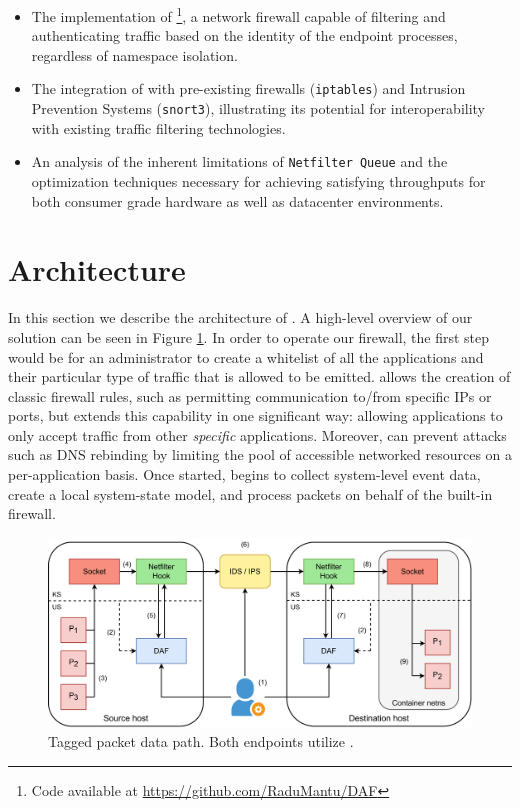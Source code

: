 \begin{itemize}
    \item The implementation of \daf{} \footnote{Code available at \url{https://github.com/RaduMantu/DAF}}, a network firewall capable of filtering and authenticating traffic based on the identity of the endpoint processes, regardless of namespace isolation.

    \item The integration of \daf{} with pre-existing firewalls (\texttt{iptables}) and Intrusion Prevention Systems (\texttt{snort3}), illustrating its potential for interoperability with existing traffic filtering technologies.

    \item An analysis of the inherent limitations of \texttt{Netfilter Queue} and the optimization techniques necessary for achieving satisfying throughputs for both consumer grade hardware as well as datacenter environments.
\end{itemize}

\section{Architecture}

In this section we describe the architecture of \daf{}. A high-level overview of our solution can be seen in Figure \ref{appfw:daf:fig:sys-architecture}. In order to operate our firewall, the first step would be for an administrator to create a whitelist of all the applications and their particular type of traffic that is allowed to be emitted. \daf{} allows the creation of classic firewall rules, such as permitting communication to/from specific IPs or ports, but extends this capability in one significant way: allowing applications to only accept traffic from other \textit{specific} applications. Moreover, \daf{} can prevent attacks such as DNS rebinding by limiting the pool of accessible networked resources on a per-application basis. Once started, \daf{} begins to collect system-level event data, create a local system-state model, and process packets on behalf of the built-in firewall.

\begin{figure}[h]
    \centering
    \includegraphics[width=0.8 \textwidth,keepaspectratio]{figures/daf-sys-architecture.pdf}
    \caption{Tagged packet data path. Both endpoints utilize \daf{}.}
    \label{appfw:daf:fig:sys-architecture}
\end{figure}

